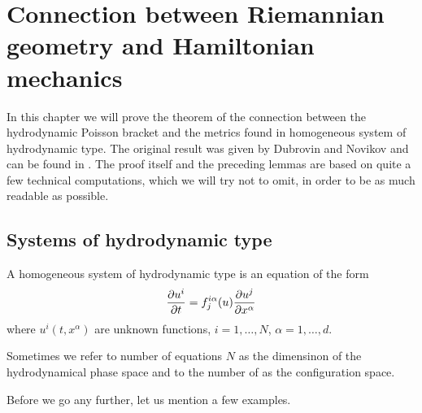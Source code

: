 \chapter{Connection between Riemannian geometry and Hamiltonian mechanics}

In this chapter we will prove the theorem of the connection between the hydrodynamic Poisson bracket and the metrics found in homogeneous system of hydrodynamic type. The original result was given by Dubrovin and Novikov and can be found in \cite{Dubrovin-Novikov}. The proof itself and the preceding lemmas are based on quite a few technical computations, which we will try not to omit, in order to be as much readable as possible. 


\section{Systems of hydrodynamic type}

\begin{definition}
    A homogeneous system of hydrodynamic type is an equation of the form
    \begin{align}
        \label{eq:h-system}
        \frac{\partial u^i}{\partial t} = f_j^{i \alpha} (u) \frac{\partial u^j}{\partial x^\alpha} 
    \end{align}
    where $u^i(t,x^\alpha)$ are unknown functions, $i = 1, \dots , N$, $\alpha = 1, \dots , d$.
\end{definition}

Sometimes we refer to number of equations $N$ as the dimensinon of the hydrodynamical phase space and to the number of as the configuration space.

Before we go any further, let us mention a few examples.

